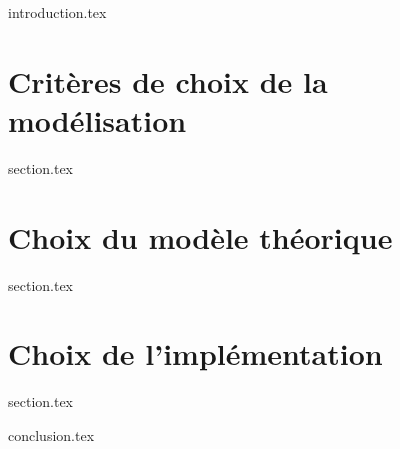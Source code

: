 
\chaptertoc{}

\label{chap:06-int}
{introduction.tex}

\section{Critères de choix de la modélisation}
\label{chap:06-sec1}
{section.tex}

\section{Choix du modèle théorique}
\label{chap:06-sec2}
{section.tex}

\section{Choix de l'implémentation}
\label{chap:06-sec3}
{section.tex}

\label{chap:06-cnc}
{conclusion.tex}

